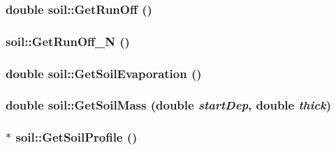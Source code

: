 \label{classsoil_ace8910daf41b497cdf1343ecbfde3e5b}
\hypertarget{classsoil_a8c7642c84b5f177603ca5c4390bac013}{
\subsubsection[{GetRunOff}]{\setlength{\rightskip}{0pt plus 5cm}double soil::GetRunOff ()}}
\label{classsoil_a8c7642c84b5f177603ca5c4390bac013}
\hypertarget{classsoil_a97ed6f98d98984975c726e39ecf1aeeb}{
\subsubsection[{GetRunOff\_\-N}]{ soil::GetRunOff\_\-N ()}}
\label{classsoil_a97ed6f98d98984975c726e39ecf1aeeb}
\hypertarget{classsoil_ae625960b7cd65dc6aba73d4e8634f84b}{
\subsubsection[{GetSoilEvaporation}]{\setlength{\rightskip}{0pt plus 5cm}double soil::GetSoilEvaporation ()}}
\label{classsoil_ae625960b7cd65dc6aba73d4e8634f84b}
\hypertarget{classsoil_ae21ef6025f587046d6de1304cb9d1dad}{
\subsubsection[{GetSoilMass}]{\setlength{\rightskip}{0pt plus 5cm}double soil::GetSoilMass (double {\em startDep}, \/  double {\em thick})}}
\label{classsoil_ae21ef6025f587046d6de1304cb9d1dad}
\hypertarget{classsoil_a07a04782ac233c63f2f2246f89fb15c6}{
\subsubsection[{GetSoilProfile}]{$\ast$ soil::GetSoilProfile ()}}
